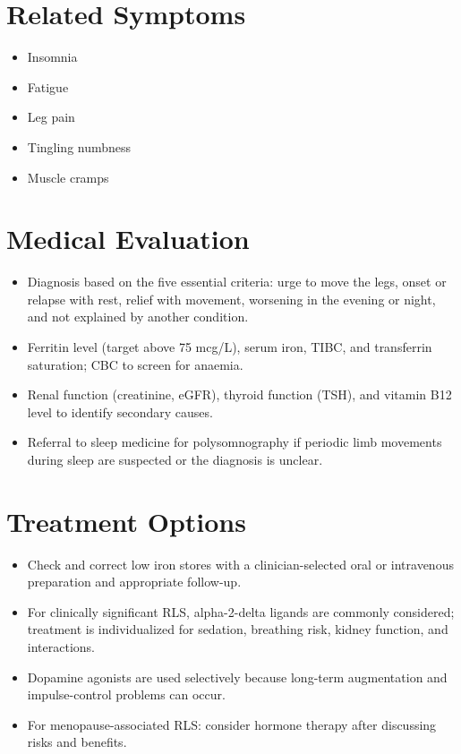 \section*{Related Symptoms}
\begin{itemize}
  \item Insomnia
  \item Fatigue
  \item Leg pain
  \item Tingling numbness
  \item Muscle cramps
\end{itemize}


\section*{Medical Evaluation}
\begin{itemize}
  \item Diagnosis based on the five essential criteria: urge to move the legs, onset or relapse with rest, relief with movement, worsening in the evening or night, and not explained by another condition.
  \item Ferritin level (target above 75 mcg/L), serum iron, TIBC, and transferrin saturation; CBC to screen for anaemia.
  \item Renal function (creatinine, eGFR), thyroid function (TSH), and vitamin B12 level to identify secondary causes.
  \item Referral to sleep medicine for polysomnography if periodic limb movements during sleep are suspected or the diagnosis is unclear.
\end{itemize}

\section*{Treatment Options}
\begin{itemize}
  \item Check and correct low iron stores with a clinician-selected oral or intravenous preparation and appropriate follow-up.
  \item For clinically significant RLS, alpha-2-delta ligands are commonly considered; treatment is individualized for sedation, breathing risk, kidney function, and interactions.
  \item Dopamine agonists are used selectively because long-term augmentation and impulse-control problems can occur.
  \item For menopause-associated RLS: consider hormone therapy after discussing risks and benefits.
\end{itemize}

